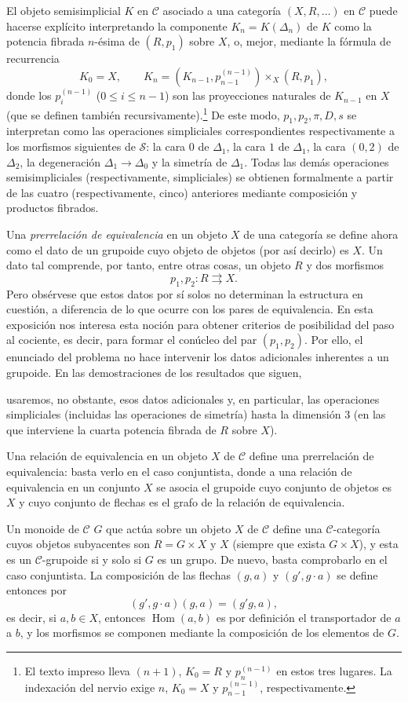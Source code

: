 \documentclass[11pt,twoside,openany]{book}
\numberwithin{equation}{section}
\newcommand{\src}[1]{%
  \phantomsection\hypertarget{src:#1}{}%
  \marginpar{\raggedleft\footnotesize\sffamily #1}%
}
\theoremstyle{plain}
\theoremstyle{definition}
\theoremstyle{remark}
\newcommand{\FgaUnitKey}{frontmatter}
\renewcommand{\src}[1]{%
  \phantomsection\hypertarget{src:\FgaUnitKey:#1}{}%
  \marginpar{\raggedleft\footnotesize\sffamily #1}%
}
\theoremstyle{plain}
\theoremstyle{definition}
\theoremstyle{remark}
\begin{document}
El objeto semisimplicial $K$ en $\mathcal C$ asociado a una categoría
$(X,R,\ldots)$ en $\mathcal C$ puede hacerse explícito interpretando la
componente $K_n=K(\Delta_n)$ de $K$ como la potencia fibrada $n$-ésima de
$(R,p_1)$ sobre $X$, o, mejor, mediante la fórmula de recurrencia
\[
  K_0=X,\qquad
  K_n=(K_{n-1},p_{n-1}^{(n-1)})\times_X(R,p_1),
\]
donde los $p_i^{(n-1)}$ ($0\leq i\leq n-1$) son las proyecciones naturales de
$K_{n-1}$ en $X$ (que se definen también recursivamente).\footnote{El texto impreso lleva $(n+1)$, $K_0=R$ y $p_n^{(n-1)}$ en estos tres lugares. La indexación del nervio exige $n$, $K_0=X$ y $p_{n-1}^{(n-1)}$, respectivamente.} De este modo,
$p_1,p_2,\pi,D,s$ se interpretan como las operaciones simpliciales
correspondientes respectivamente a los morfismos siguientes de $\mathcal S$:
la cara $0$ de $\Delta_1$, la cara $1$ de $\Delta_1$, la cara $(0,2)$ de
$\Delta_2$, la degeneración $\Delta_1\to\Delta_0$ y la simetría de
$\Delta_1$. Todas las demás operaciones semisimpliciales (respectivamente,
simpliciales) se obtienen formalmente a partir de las cuatro (respectivamente,
cinco) anteriores mediante composición y productos fibrados.

Una \emph{prerrelación de equivalencia} en un objeto $X$ de una categoría se
define ahora como el dato de un grupoide cuyo objeto de objetos (por así
decirlo) es $X$. Un dato tal comprende, por tanto, entre otras cosas, un
objeto $R$ y dos morfismos
\[
  p_1,p_2:R\rightrightarrows X.
\]
Pero obsérvese que estos datos por sí solos no determinan la estructura en
cuestión, a diferencia de lo que ocurre con los pares de equivalencia. En esta
exposición nos interesa esta noción para obtener criterios de posibilidad del
paso al cociente, es decir, para formar el conúcleo del par $(p_1,p_2)$. Por
ello, el enunciado del problema no hace intervenir los datos adicionales
inherentes a un grupoide. En las demostraciones de los resultados que siguen,
\src{110}
usaremos, no obstante, esos datos adicionales y, en particular, las
operaciones simpliciales (incluidas las operaciones de simetría) hasta la
dimensión $3$ (en las que interviene la cuarta potencia fibrada de $R$ sobre
$X$).

Una relación de equivalencia en un objeto $X$ de $\mathcal C$ define una
prerrelación de equivalencia: basta verlo en el caso conjuntista, donde a una
relación de equivalencia en un conjunto $X$ se asocia el grupoide cuyo
conjunto de objetos es $X$ y cuyo conjunto de flechas es el grafo de la
relación de equivalencia.

Un monoide de $\mathcal C$ $G$ que actúa sobre un objeto $X$ de $\mathcal C$
define una $\mathcal C$-categoría cuyos objetos subyacentes son $R=G\times X$
y $X$ (siempre que exista $G\times X$), y esta es un $\mathcal C$-grupoide si
y solo si $G$ es un grupo. De nuevo, basta comprobarlo en el caso conjuntista.
La composición de las flechas $(g,a)$ y $(g',g\cdot a)$ se define entonces por
\[
  (g',g\cdot a)(g,a)=(g'g,a),
\]
es decir, si $a,b\in X$, entonces $\operatorname{Hom}(a,b)$ es por definición
el transportador de $a$ a $b$, y los morfismos se componen mediante la
composición de los elementos de $G$.
\end{document}
